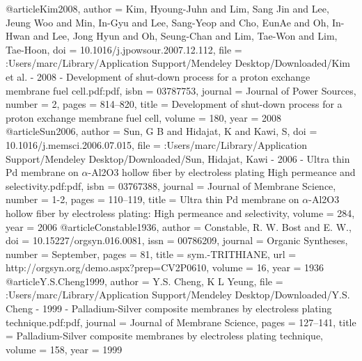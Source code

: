 @article{Kim2008,
author = {Kim, Hyoung-Juhn and Lim, Sang Jin and Lee, Jeung Woo and Min, In-Gyu and Lee, Sang-Yeop and Cho, EunAe and Oh, In-Hwan and Lee, Jong Hyun and Oh, Seung-Chan and Lim, Tae-Won and Lim, Tae-Hoon},
doi = {10.1016/j.jpowsour.2007.12.112},
file = {:Users/marc/Library/Application Support/Mendeley Desktop/Downloaded/Kim et al. - 2008 - Development of shut-down process for a proton exchange membrane fuel cell.pdf:pdf},
isbn = {03787753},
journal = {Journal of Power Sources},
number = {2},
pages = {814--820},
title = {{Development of shut-down process for a proton exchange membrane fuel cell}},
volume = {180},
year = {2008}
}
@article{Sun2006,
author = {Sun, G B and Hidajat, K and Kawi, S},
doi = {10.1016/j.memsci.2006.07.015},
file = {:Users/marc/Library/Application Support/Mendeley Desktop/Downloaded/Sun, Hidajat, Kawi - 2006 - Ultra thin Pd membrane on $\alpha$-Al2O3 hollow fiber by electroless plating High permeance and selectivity.pdf:pdf},
isbn = {03767388},
journal = {Journal of Membrane Science},
number = {1-2},
pages = {110--119},
title = {{Ultra thin Pd membrane on $\alpha$-Al2O3 hollow fiber by electroless plating: High permeance and selectivity}},
volume = {284},
year = {2006}
}
@article{Constable1936,
author = {Constable, R. W. Bost and E. W.},
doi = {10.15227/orgsyn.016.0081},
issn = {00786209},
journal = {Organic Syntheses},
number = {September},
pages = {81},
title = {{sym.-TRITHIANE}},
url = {http://orgsyn.org/demo.aspx?prep=CV2P0610},
volume = {16},
year = {1936}
}
@article{Y.S.Cheng1999,
author = {{Y.S. Cheng}, K L Yeung},
file = {:Users/marc/Library/Application Support/Mendeley Desktop/Downloaded/Y.S. Cheng - 1999 - Palladium-Silver composite membranes by electroless plating technique.pdf:pdf},
journal = {Journal of Membrane Science},
pages = {127--141},
title = {{Palladium-Silver composite membranes by electroless plating technique}},
volume = {158},
year = {1999}
}
